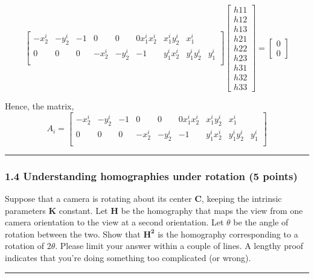 \documentclass[11pt]{article}
\begin{document}
\[
\begin{bmatrix}
- x^i_2 & - y^i_2 & -1 & 0 & 0 & 0 x^i_1x^i_2 & x^i_1y^i_2 & x^i_1\\
0 & 0 & 0 & - x^i_2 & - y^i_2 & -1 & y^i_1x^i_2 & y^i_1y^i_2 & y^i_1\\
\end{bmatrix}
\begin{bmatrix}
h11\\
h12\\
h13\\
h21\\
h22\\
h23\\
h31\\
h32\\
h33
\end{bmatrix} = \begin{bmatrix}0\\0\end{bmatrix}\]

Hence, the matrix, \[A_i = \begin{bmatrix}
- x^i_2 & - y^i_2 & -1 & 0 & 0 & 0 x^i_1x^i_2 & x^i_1y^i_2 & x^i_1\\
0 & 0 & 0 & - x^i_2 & - y^i_2 & -1 & y^i_1x^i_2 & y^i_1y^i_2 & y^i_1\\
\end{bmatrix}\]

\begin{center}\rule{0.5\linewidth}{0.5pt}\end{center}

    \hypertarget{understanding-homographies-under-rotation-5-points}{%
\subsubsection{1.4 Understanding homographies under rotation (5
points)}\label{understanding-homographies-under-rotation-5-points}}

Suppose that a camera is rotating about its center \(\mathbf{C}\),
keeping the intrinsic parameters \(\mathbf{K}\) constant. Let
\(\mathbf{H}\) be the homography that maps the view from one camera
orientation to the view at a second orientation. Let \(\theta\) be the
angle of rotation between the two. Show that \(\mathbf{H^2}\) is the
homography corresponding to a rotation of 2\(\theta\). Please limit your
answer within a couple of lines. A lengthy proof indicates that you're
doing something too complicated (or wrong).

    \begin{center}\rule{0.5\linewidth}{0.5pt}\end{center}
\end{document}
